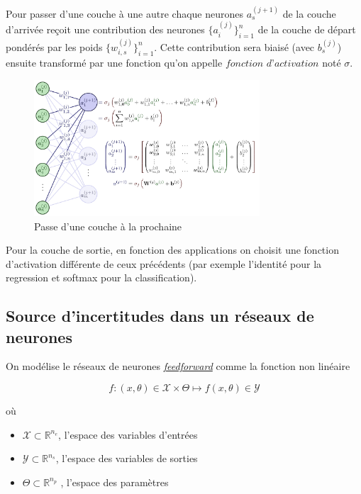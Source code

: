 \documentclass[french,12pt]{article}
\begin{document}
Pour passer d'une couche à une autre chaque neurones $a^{(j + 1)}_s$ de la couche d'arrivée reçoit une contribution
des neurones $\{a^{(j)}_i\}_{i = 1}^n$ de la couche de départ pondérés par les poids
$\{w^{(j)}_{i,s}\}_{i = 1}^n$. Cette contribution sera biaisé (avec $b^{(j)}_s$) ensuite transformé par une fonction
qu'on appelle $\textit{fonction d'activation}$ noté $\sigma$.

\begin{figure}[H]
    \centerline{\includegraphics[width = 0.75\textwidth]{FNN/Images/fnnDetails/fnnDetails_page-0001.jpg}}
    \caption{Passe d'une couche à la prochaine \cite{NeetGraph}}
    \label{fig:fnnDetails}
\end{figure}

Pour la couche de sortie, en fonction des applications on choisit une fonction d'activation
différente de ceux précédents (par exemple l'identité pour la regression et softmax pour la classification).

\subsection{Source d'incertitudes dans un réseaux de neurones}

On modélise le réseaux de neurones \href{https://en.wikipedia.org/wiki/Feedforward_neural_network}{\textit{feedforward}} comme la fonction non linéaire

$$f : (x, \theta) \in \mathcal{X} \times \Theta \mapsto f(x, \theta) \in \mathcal{Y}$$

où

\begin{itemize}
    \item $\mathcal{X} \subset \mathbb{R}^{n_e}$, l'espace des variables d'entrées
    \item $\mathcal{Y} \subset \mathbb{R}^{n_s}$, l'espace des variables de sorties
    \item $\Theta \subset \mathbb{R}^{n_p}$ , l'espace des paramètres
\end{itemize}
\end{document}
